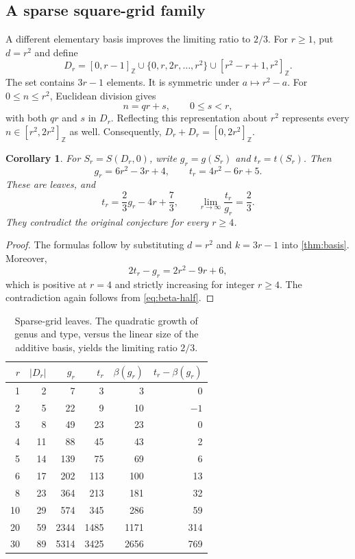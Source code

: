 \documentclass[11pt,letterpaper]{article}
\numberwithin{equation}{section}
\newtheorem{corollary}[theorem]{Corollary}
\theoremstyle{definition}
\theoremstyle{remark}
\newcommand{\Z}{\mathbb Z}
\newcommand{\ints}[2]{[#1,#2]_{\Z}}
\newcommand{\conjb}{\beta}
\begin{document}
\subsection{A sparse square-grid family}

A different elementary basis improves the limiting ratio to $2/3$. For
$r\ge1$, put $d=r^2$ and define
\begin{equation}\label{eq:gridD}
 D_r=\ints{0}{r-1}\cup\{0,r,2r,\ldots,r^2\}
       \cup\ints{r^2-r+1}{r^2}.
\end{equation}
The set contains $3r-1$ elements. It is symmetric under $a\mapsto r^2-a$.
For $0\le n\le r^2$, Euclidean division gives
\[
 n=qr+s,\qquad 0\le s<r,
\]
with both $qr$ and $s$ in $D_r$. Reflecting this representation about $r^2$
represents every $n\in\ints{r^2}{2r^2}$ as well. Consequently,
$D_r+D_r=\ints{0}{2r^2}$.

\begin{corollary}\label{cor:grid}
For $S_r=S(D_r,0)$, write $g_r=g(S_r)$ and $t_r=t(S_r)$. Then
\begin{equation}\label{eq:gridgt}
 g_r=6r^2-3r+4,\qquad t_r=4r^2-6r+5.
\end{equation}
These are leaves, and
\begin{equation}\label{eq:gridratio}
 t_r=\frac23g_r-4r+\frac73,\qquad
 \lim_{r\to\infty}\frac{t_r}{g_r}=\frac23.
\end{equation}
They contradict the original conjecture for every $r\ge4$.
\end{corollary}

\begin{proof}
The formulas follow by substituting $d=r^2$ and $k=3r-1$ into
\cref{thm:basis}. Moreover,
\[
 2t_r-g_r=2r^2-9r+6,
\]
which is positive at $r=4$ and strictly increasing for integer $r\ge4$.
The contradiction again follows from \eqref{eq:beta-half}.
\end{proof}

\begin{table}[htbp]
\centering
\begin{tabular}{rrrrrr}
\toprule
$r$ & $|D_r|$ & $g_r$ & $t_r$ & $\conjb(g_r)$ & $t_r-\conjb(g_r)$\\
\midrule
1&2&7&3&3&0\\
2&5&22&9&10&$-1$\\
3&8&49&23&23&0\\
4&11&88&45&43&2\\
5&14&139&75&69&6\\
6&17&202&113&100&13\\
8&23&364&213&181&32\\
10&29&574&345&286&59\\
20&59&2344&1485&1171&314\\
30&89&5314&3425&2656&769\\
\bottomrule
\end{tabular}
\caption{Sparse-grid leaves. The quadratic growth of genus and type, versus the
linear size of the additive basis, yields the limiting ratio $2/3$.}
\label{tab:grid}
\end{table}
\end{document}
